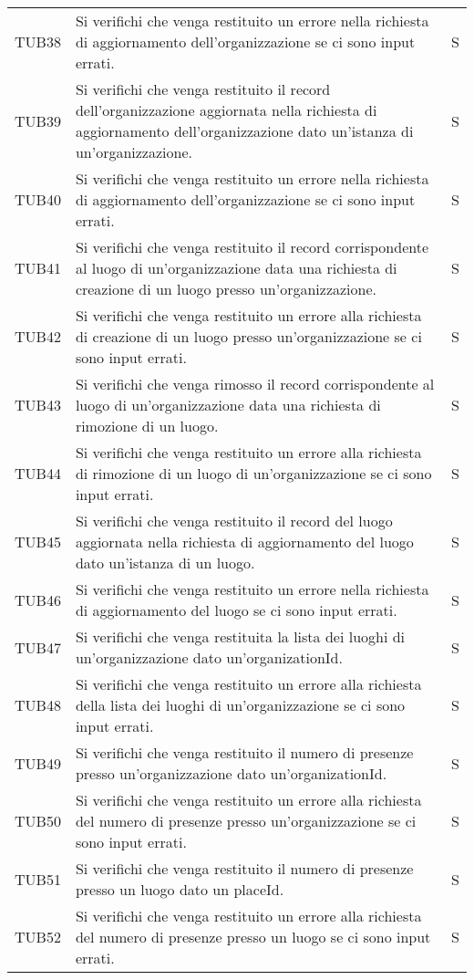 {\begin{longtable}{ c C{13cm} C{1cm}}
TUB38 & Si verifichi che venga restituito un errore nella richiesta di aggiornamento dell'organizzazione se ci sono input errati. & S \\
TUB39 & Si verifichi che venga restituito il record dell'organizzazione aggiornata nella richiesta di aggiornamento dell'organizzazione dato un'istanza di un'organizzazione. & S \\
TUB40 & Si verifichi che venga restituito un errore nella richiesta di aggiornamento dell'organizzazione se ci sono input errati. & S \\
TUB41 & Si verifichi che venga restituito il record corrispondente al luogo di un'organizzazione data una richiesta di creazione di un luogo presso un'organizzazione. & S \\
TUB42 & Si verifichi che venga restituito un errore alla richiesta di creazione di un luogo presso un'organizzazione se ci sono input errati. & S \\
TUB43 & Si verifichi che venga rimosso il record corrispondente al luogo di un'organizzazione data una richiesta di rimozione di un luogo. & S \\
TUB44 & Si verifichi che venga restituito un errore alla richiesta di rimozione di un luogo di un'organizzazione se ci sono input errati. & S \\
TUB45 & Si verifichi che venga restituito il record del luogo aggiornata nella richiesta di aggiornamento del luogo dato un'istanza di un luogo. & S \\
TUB46 & Si verifichi che venga restituito un errore nella richiesta di aggiornamento del luogo se ci sono input errati. & S \\
TUB47 & Si verifichi che venga restituita la lista dei luoghi di un'organizzazione dato un'organizationId. & S \\
TUB48 & Si verifichi che venga restituito un errore alla richiesta della lista dei luoghi di un'organizzazione se ci sono input errati. & S \\
TUB49 & Si verifichi che venga restituito il numero di presenze presso un'organizzazione dato un'organizationId. & S \\
TUB50 & Si verifichi che venga restituito un errore alla richiesta del numero di presenze presso un'organizzazione se ci sono input errati. & S \\
TUB51 & Si verifichi che venga restituito il numero di presenze presso un luogo dato un placeId. & S \\
TUB52 & Si verifichi che venga restituito un errore alla richiesta del numero di presenze presso un luogo se ci sono input errati. & S \\

\end{longtable}}
